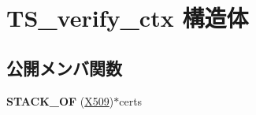 \hypertarget{struct_t_s__verify__ctx}{}\section{T\+S\+\_\+verify\+\_\+ctx 構造体}
\label{struct_t_s__verify__ctx}
\subsection*{公開メンバ関数}
\begin{DoxyCompactItemize}
\item 
\hypertarget{struct_t_s__verify__ctx_a36e6c2b04d76cae5b17aa2d45a371157}{}{\bfseries S\+T\+A\+C\+K\+\_\+\+O\+F} (\hyperlink{structx509__st}{X509})$\ast$certs\label{struct_t_s__verify__ctx_a36e6c2b04d76cae5b17aa2d45a371157}

\end{DoxyCompactItemize}
